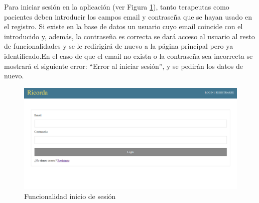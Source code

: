 Para iniciar sesión en la aplicación (ver Figura \ref{fig:funcionalidadlogin}), tanto terapeutas como pacientes deben introducir los campos email y contraseña que se hayan usado en el registro. Si existe en la base de datos un usuario cuyo email coincide con el introducido y, además, la contraseña es correcta se dará acceso al usuario al resto de funcionalidades y se le redirigirá de nuevo a la página principal pero ya identificado.En el caso de que el email no exista o la contraseña sea incorrecta se mostrará el siguiente error: ``Error al iniciar sesión'', y se pedirán los datos de nuevo.

\begin{figure}[h]
	\centering
	\includegraphics[scale=0.5]{Imagenes/Vectorial/funcionalidad_login}
	\caption{Funcionalidad inicio de sesión}
	\label{fig:funcionalidadlogin}
\end{figure}

